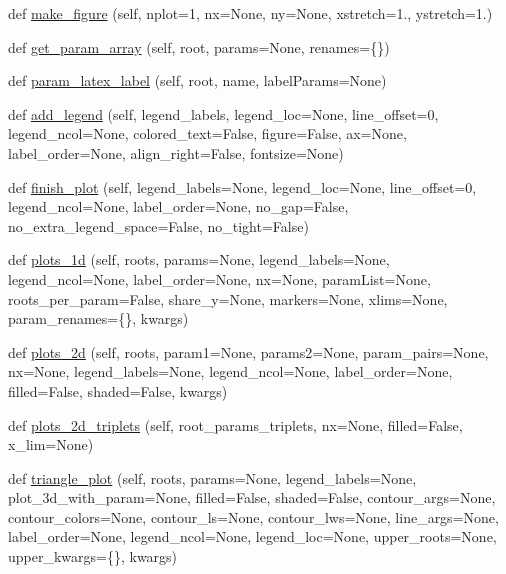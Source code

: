\begin{DoxyCompactItemize}
\item 
def \mbox{\hyperlink{classgetdist_1_1plots_1_1GetDistPlotter_a07ead3d7a1afc0b7b944292e92342084}{make\+\_\+figure}} (self, nplot=1, nx=None, ny=None, xstretch=1., ystretch=1.)
\item 
def \mbox{\hyperlink{classgetdist_1_1plots_1_1GetDistPlotter_a0b580d3d50c53c534fa8c1a6cefea4d0}{get\+\_\+param\+\_\+array}} (self, root, params=None, renames=\{\})
\item 
def \mbox{\hyperlink{classgetdist_1_1plots_1_1GetDistPlotter_a9f6d27f2345ccb87720770ddb81258d5}{param\+\_\+latex\+\_\+label}} (self, root, name, label\+Params=None)
\item 
def \mbox{\hyperlink{classgetdist_1_1plots_1_1GetDistPlotter_ac9e49994c54fdfa9120acddc2c19c352}{add\+\_\+legend}} (self, legend\+\_\+labels, legend\+\_\+loc=None, line\+\_\+offset=0, legend\+\_\+ncol=None, colored\+\_\+text=False, figure=False, ax=None, label\+\_\+order=None, align\+\_\+right=False, fontsize=None)
\item 
def \mbox{\hyperlink{classgetdist_1_1plots_1_1GetDistPlotter_a2ab4d56845a5abefe27c2d5d62bfb680}{finish\+\_\+plot}} (self, legend\+\_\+labels=None, legend\+\_\+loc=None, line\+\_\+offset=0, legend\+\_\+ncol=None, label\+\_\+order=None, no\+\_\+gap=False, no\+\_\+extra\+\_\+legend\+\_\+space=False, no\+\_\+tight=False)
\item 
def \mbox{\hyperlink{classgetdist_1_1plots_1_1GetDistPlotter_a7cd2a179b15d78d19f07760d0ba698a1}{plots\+\_\+1d}} (self, roots, params=None, legend\+\_\+labels=None, legend\+\_\+ncol=None, label\+\_\+order=None, nx=None, param\+List=None, roots\+\_\+per\+\_\+param=False, share\+\_\+y=None, markers=None, xlims=None, param\+\_\+renames=\{\}, kwargs)
\item 
def \mbox{\hyperlink{classgetdist_1_1plots_1_1GetDistPlotter_a0e610a87566737a4b66974d2d721caaa}{plots\+\_\+2d}} (self, roots, param1=None, params2=None, param\+\_\+pairs=None, nx=None, legend\+\_\+labels=None, legend\+\_\+ncol=None, label\+\_\+order=None, filled=False, shaded=False, kwargs)
\item 
def \mbox{\hyperlink{classgetdist_1_1plots_1_1GetDistPlotter_a003f6bc9220702f977aaaa73c64b1cb3}{plots\+\_\+2d\+\_\+triplets}} (self, root\+\_\+params\+\_\+triplets, nx=None, filled=False, x\+\_\+lim=None)
\item 
def \mbox{\hyperlink{classgetdist_1_1plots_1_1GetDistPlotter_a92380ecaa3180adba902208e5d646329}{triangle\+\_\+plot}} (self, roots, params=None, legend\+\_\+labels=None, plot\+\_\+3d\+\_\+with\+\_\+param=None, filled=False, shaded=False, contour\+\_\+args=None, contour\+\_\+colors=None, contour\+\_\+ls=None, contour\+\_\+lws=None, line\+\_\+args=None, label\+\_\+order=None, legend\+\_\+ncol=None, legend\+\_\+loc=None, upper\+\_\+roots=None, upper\+\_\+kwargs=\{\}, kwargs)

\end{DoxyCompactItemize}
